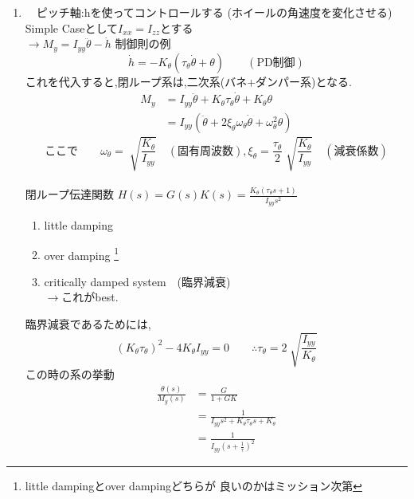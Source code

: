 \documentclass[class=article, crop=false, dvipdfmx]{standalone}
\begin{document}
\begin{enumerate}[label=(\theenumi)]%
\item　ピッチ軸:hを使ってコントロールする
(ホイールの角速度を変化させる)\\
Simple Caseとして$I_{xx}=I_{zz}$とする\\
$\rightarrow M_y=I_{yy}\ddot{\theta}-\dot{h}$
制御則の例
\begin{equation}
\dot{h}=-K_{\theta}(\tau_{\theta}\dot{\theta}+\theta)
\qquad(\text{PD制御})
\end{equation}
これを代入すると,閉ループ系は,二次系(バネ+ダンパー系)となる.
\begin{align}
M_y
&=
I_{yy}\ddot{\theta}+
K_{\theta}\tau_{\theta}\dot{\theta}+K_{\theta}\theta
\\
&=
I_{yy}
(\ddot{\theta}+
2\xi_{\theta}\omega_{\theta}\dot{\theta}
+\omega^2_{\theta}\theta)
\end{align}
\begin{equation}
\text{ここで}
\qquad
\omega_{\theta}=
\sqrt[]{\frac{K_{\theta}}{I_{yy}}}\quad
(\text{固有周波数}),
\xi_{\theta}=
\frac{\tau_{\theta}}{2}
\sqrt[]{\frac{K_{\theta}}{I_{yy}}}
\quad( \text{減衰係数})
\end{equation}
\\		%
閉ループ伝達関数
$
H(s)=G(s)K(s)=
\frac{K_{\theta}(\tau_{\theta}s+1)}{I_{yy}s^2}
$

\begin{enumerate}[label=\protect\circled{\arabic*}]
\item little damping
\item over damping
\footnote{little dampingとover dampingどちらが
良いのかはミッション次第}
\item critically damped system　(臨界減衰)\\
$\rightarrow$これがbest.
\end{enumerate}
臨界減衰であるためには,
\begin{equation}
(K_{\theta}\tau_{\theta})^2
-4K_{\theta}I_{yy}=0\qquad
\therefore
\tau_{\theta}=2
\sqrt[]{\frac{I_{yy}}{K_{\theta}}}
\end{equation}
この時の系の挙動
\begin{align}
\frac{\theta(s)}{M_{y}(s)}&=\frac{G}{1+GK}\\
&=
\frac{1}
{I_{yy}s^2+K_{\theta}\tau_{\theta}s+K_{\theta}}\\
&=
\frac{1}{I_{yy}(s+\frac{1}{\tau})^2}
\end{align}


\end{enumerate}
\end{document}
